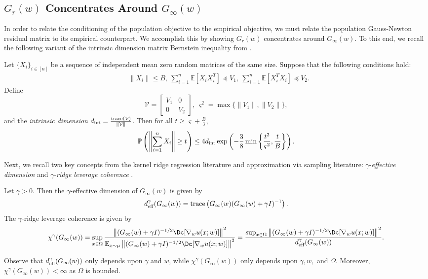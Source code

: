 \subsection{$G_r(w)$ Concentrates Around $G_{\infty}(w)$}
In order to relate the conditioning of the population objective to the empirical objective, we must relate the population Gauss-Newton residual matrix to its empirical counterpart. 
We accomplish this by showing $G_r(w)$ concentrates around $G_{\infty}(w)$. 
To this end, we recall the following variant of the intrinsic dimension matrix Bernstein inequality from \citet{tropp2015introduction}.
\begin{theorem}
 \label{thm:int_bern}
    Let $\{X_i\}_{i\in [n]}$ be a sequence of independent mean zero random matrices of the same size. 
    Suppose that the following conditions hold:
    \begin{align*}
        &\|X_i\|  \leq B,~\sum^{n}_{i=1}\mathbb E[X_i X_i^{T}]\preceq V_1,~\sum^{n}_{i=1}\mathbb E[X_i^{T} X_i]\preceq V_2.
    \end{align*}
    Define 
    \[\mathcal V = 
    \begin{bmatrix}
        V_1 & 0 \\
        0   &  V_2
    \end{bmatrix},~ \varsigma^2 = \max\{\|V_1\|,\|V_2\|\},
    \]
    and the \emph{intrinsic dimension} $d_{\textup{int}} = \frac{\textup{trace}(\mathcal V)}{\|\mathcal V\|}$.
    \newline
    Then for all $t\geq \varsigma+\frac{B}{3}$, 
    \[
    \mathbb P\left(\left\|\sum^{n}_{i=1}X_i\right\|\geq t\right) \leq 4d_{\textup{int}}\exp\left(-\frac{3}{8}\min\left\{\frac{t^2}{\varsigma^2},\frac{t}{B}\right\}\right).
    \]   
\end{theorem}

Next, we recall two key concepts from the kernel ridge regression literature and approximation via sampling literature: $\gamma$-\emph{effective dimension} and $\gamma$-\emph{ridge leverage coherence} \cite{bach2013sharp,cohen2017input,rudi2017falkon}. 
\begin{definition}
    Let $\gamma>0$. 
    Then the $\gamma$-effective dimension of $G_{\infty}(w)$ is given by
    \[
    d^{\gamma}_{\textup{eff}}(G_{\infty}(w)) = \textup{trace}\left(G_{\infty}(w)(G_{\infty}(w)+\gamma I)^{-1}\right).
    \]
    The $\gamma$-ridge leverage coherence is given by
    \[
    \chi^\gamma(G_{\infty}(w)) = \sup_{x\in \Omega}\frac{\left\|(G_{\infty}(w)+\gamma I)^{-1/2}\Dc[\nabla_w u(x;w)]\right\|^2}{\mathbb E_{x\sim \mu}\left\|(G_{\infty}(w)+\gamma I)^{-1/2}\Dc[\nabla_w u(x;w)]\right\|^2} = \frac{\sup_{x\in \Omega}{\left\|(G_{\infty}(w)+\gamma I)^{-1/2}\Dc[\nabla_w u(x;w)]\right\|^2}}{{d^{\gamma}_{\textup{eff}}(G_{\infty}(w))}}.
    \]
\end{definition}
Observe that $d^{\gamma}_{\textup{eff}}(G_{\infty}(w))$ only depends upon $\gamma$ and $w$, while $\chi^\gamma(G_{\infty}(w)) $ only depends upon $\gamma, w,$ and $\Omega$. 
Moreover, $\chi^\gamma(G_{\infty}(w))<\infty$ as $\Omega$ is bounded. 

